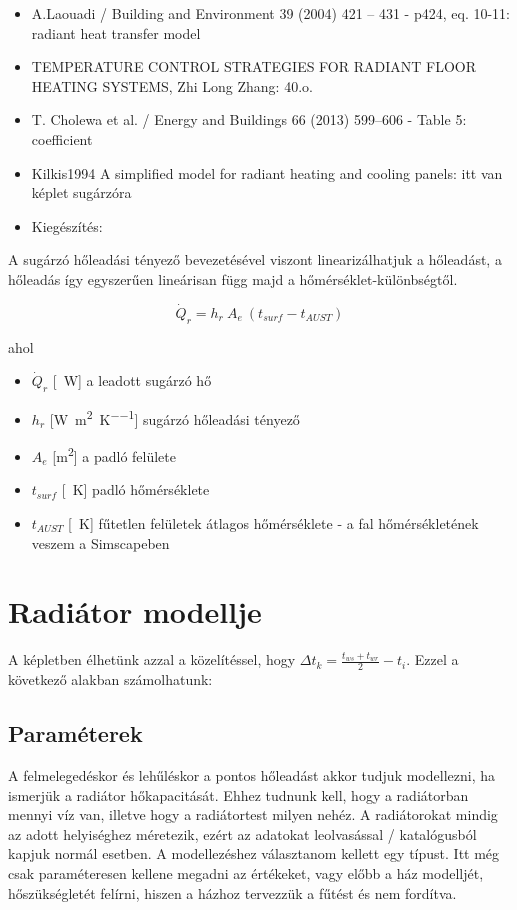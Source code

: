 \begin{itemize}[itemsep=0pt,topsep=0pt,parsep=0pt,partopsep=0pt]
	\item A.Laouadi / Building and Environment 39 (2004) 421 – 431 - p424, eq. 10-11: radiant heat transfer model
	\item TEMPERATURE CONTROL STRATEGIES FOR RADIANT FLOOR HEATING SYSTEMS, Zhi Long Zhang: 40.o.  
	\item \cite{CHOLEWA2013599} T. Cholewa et al. / Energy and Buildings 66 (2013) 599–606 - Table 5: coefficient
	\item Kilkis1994 A simplified model for radiant heating and cooling panels: itt van képlet sugárzóra
	\item Kiegészítés: \cite[349.~o.]{Herz}
\end{itemize}  

A sugárzó hőleadási tényező bevezetésével viszont linearizálhatjuk a hőleadást, a hőleadás így egyszerűen lineárisan függ majd a hőmérséklet-különbségtől.

\begin{equation} \label{eq_radi-and-convective-htotal}
\dot Q_{r} = h_r ~ A_e ~ \left(t_{surf}-t_{AUST}\right)
\end{equation}

ahol
\begin{itemize}[itemsep=3pt,topsep=0pt,parsep=0pt,partopsep=0pt]
	\item[] $\dot{Q}_{r}$ [\SI{}{\watt}] a leadott sugárzó hő
	\item[] $h_r$ [\si[per-mode = fraction]{\watt\per\meter\squared\per\kelvin}] sugárzó hőleadási tényező
	\item[] $A_e$ [\si{\metre\squared}] a padló felülete
	\item[] $t_{surf}$ [\SI{}{\kelvin}] padló hőmérséklete
	\item[] $t_{AUST}$ [\SI{}{\kelvin}] fűtetlen felületek átlagos hőmérséklete - a fal hőmérsékletének veszem a Simscapeben
\end{itemize}


\section{Radiátor modellje}

A képletben élhetünk azzal a közelítéssel, hogy $\Delta t_k=\frac{t_{ws}+t_{wr}}{2}-t_i$. Ezzel a következő alakban számolhatunk:

\subsection{Paraméterek}
A felmelegedéskor és lehűléskor a pontos hőleadást akkor tudjuk modellezni, ha ismerjük a radiátor hőkapacitását. Ehhez tudnunk kell, hogy a radiátorban mennyi víz van, illetve hogy a radiátortest milyen nehéz.
A radiátorokat mindig az adott helyiséghez méretezik, ezért az adatokat leolvasással / katalógusból kapjuk normál esetben. A modellezéshez választanom kellett egy típust. Itt még csak paraméteresen kellene megadni az értékeket, vagy előbb a ház modelljét, hőszükségletét felírni, hiszen a házhoz tervezzük a fűtést és nem fordítva.

